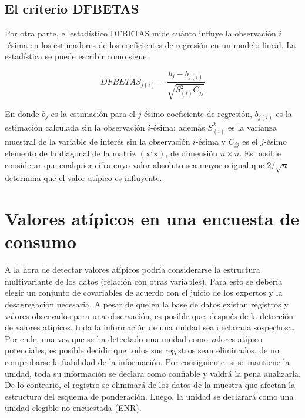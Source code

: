 \documentclass[
  12pt,
  spanish,
]{book}
\begin{document}
\hypertarget{el-criterio-dfbetas}{%
\subsection{El criterio DFBETAS}\label{el-criterio-dfbetas}}

Por otra parte, el estadístico DFBETAS mide cuánto influye la observación \(i\)-ésima en los estimadores de los coeficientes de regresión en un modelo lineal. La estadística se puede escribir como sigue:

\[
DFBETAS_{j(i)} = \dfrac{b_j-b_{j(i)}}{\sqrt{S^2_{(i)}C_{jj}}} 
\]

En donde \(b_j\) es la estimación para el \(j\)-ésimo coeficiente de regresión, \(b_{j(i)}\) es la estimación calculada sin la observación \(i\)-ésima; además \(S^2_{(i)}\) es la varianza muestral de la variable de interés sin la observación \(i\)-ésima y \(C_{jj}\) es el \(j\)-ésimo elemento de la diagonal de la matriz \((\mathbf x' \mathbf x)\), de dimensión \(n\times n\). Es posible considerar que cualquier cifra cuyo valor absoluto sea mayor o igual que \(2/\sqrt n\) determina que el valor atípico es influyente.

\hypertarget{valores-atuxedpicos-en-una-encuesta-de-consumo}{%
\section{Valores atípicos en una encuesta de consumo}\label{valores-atuxedpicos-en-una-encuesta-de-consumo}}

A la hora de detectar valores atípicos podría considerarse la estructura multivariante de los datos (relación con otras variables). Para esto se debería elegir un conjunto de covariables de acuerdo con el juicio de los expertos y la desagregación necesaria. A pesar de que en la base de datos existan registros y valores observados para una observación, es posible que, después de la detección de valores atípicos, toda la información de una unidad sea declarada sospechosa. Por ende, una vez que se ha detectado una unidad como valores atípico potenciales, es posible decidir que todos sus registros sean eliminados, de no comprobarse la fiabilidad de la información. Por consiguiente, si se mantiene la unidad, toda su información se declara como confiable y valdrá la pena analizarla. De lo contrario, el registro se eliminará de los datos de la muestra que afectan la estructura del esquema de ponderación. Luego, la unidad se declarará como una unidad elegible no encuestada (ENR).
\end{document}
